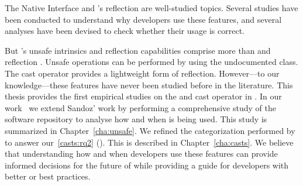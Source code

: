 The \java{} Native Interface and \java{}'s reflection \api{} are well-studied topics.
Several studies have been conducted to understand why developers use these features,
and several analyses have been devised to check whether their usage is correct.

But \java{}'s unsafe intrinsics and reflection capabilities comprise more than \jni{} and reflection \api{}.
Unsafe operations can be performed by using the undocumented \smu{} class.
The cast operator provides a lightweight form of reflection.
However---to our knowledge---these features have never been studied before in the literature.
This thesis provides the first empirical studies on the \unsafe{} \api{} and cast operator in \java{}.
In our work~\citep{mastrangeloUseYourOwn2015} we extend Sandoz' work
by performing a comprehensive study of the \mavencentral{}
software repository to analyse how and when \smu{} is being used.
This study is summarized in Chapter~\ref{cha:unsafe}.
We refined the categorization performed by \cite{wintherGuardedTypePromotion2011} to answer our~\ref{casts:rq2} (\emph{\crqB}).
This is described in Chapter~\ref{cha:casts}.
We believe that understanding how and when developers use these features can provide informed decisions for the future of \java{} while providing a guide for developers with better or best practices.

